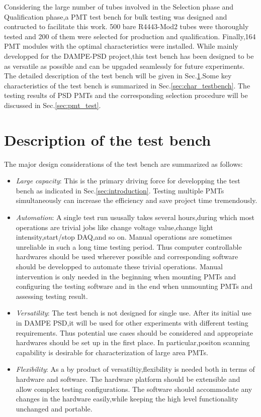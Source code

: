 \documentclass[preprint,5p,times]{elsarticle}
\begin{document}
Considering the large number of tubes involved in the Selection phase and Qualification phase,a PMT test bench for bulk testing was designed and contructed to facilitate this work.
500 bare R4443-Mod2 tubes were thoroughly tested and 200 of them were selected for production and qualification.
Finally,164 PMT modules with the optimal characteristics were installed.
While mainly developped for the DAMPE-PSD project,this test bench has been designed to be as versatile as possible and can be upgaded seamlessly for future experiments.
The detailed description of the test bench will be given in Sec.\ref{sec:description}.Some key characteristics of the test bench is summarized in Sec.\ref{sec:char_testbench}.
The testing results of PSD PMTs and the corresponding selection procedure will be discussed in Sec.\ref{sec:pmt_test}.

\section{Description of the test bench}
\label{sec:description}

The major design considerations of the test bench are summarized as follows:
\begin{itemize}
 \item \textit{Large capacity}: This is the primary driving force for developping the test bench as indicated in Sec.\ref{sec:introduction}.
 Testing multiple PMTs simultaneously can increase the efficiency and save project time tremendously. 
 \item \textit{Automation}: A single test run ususally takes several hours,during which most operations are trivial jobs like change voltage value,change light intensity,start/stop DAQ,and so on.
 Manual operations are sometimes unreliable in such a long time testing period.
 Thus computer controllable hardwares should be used wherever possible and corresponding software should be developped to automate these trivial operations.
 Manual intervention is only needed in the beginning when mounting PMTs and configuring the testing software and in the end when unmounting PMTs and assessing testing result. 
 \item \textit{Versatility}: The test bench is not designed for single use.
 After its initial use in DAMPE PSD,it will be used for other experiments with different testing requirements.
 Thus potential use cases should be considered and appropriate hardwares should be set up in the first place.
 In particular,positon scanning capability is desirable for characterization of large area PMTs. 
 \item \textit{Flexibility}: As a by product of versatiltiy,flexibility is needed both in terms of hardware and software.
 The hardware platform should be extensible and allow complex testing configurations.
 The software should accommodate any changes in the hardware easily,while keeping the high level functionality unchanged and portable. 
\end{itemize}
\end{document}
